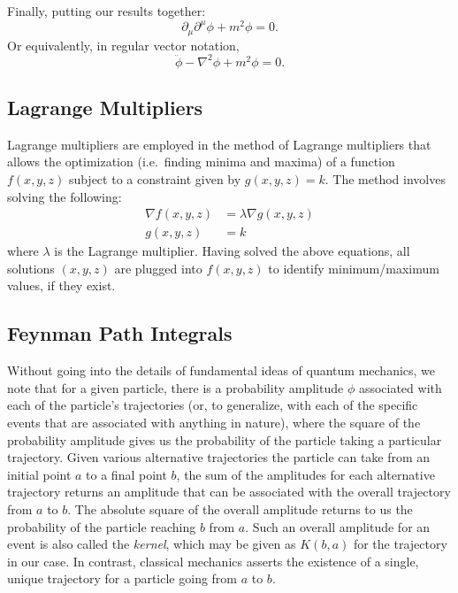 \documentclass[12pt]{revtex4}
\begin{document}
Finally, putting our results together:
\[ \partial_{\mu}\partial^{\mu}\phi + m^2 \phi = 0 .\]
Or equivalently, in regular vector notation,
\[ \ddot{\phi} - \nabla^2\phi + m^2 \phi = 0. \]

\subsection{Lagrange Multipliers} \label{multpliers}
Lagrange multipliers are employed in the method of Lagrange multipliers that allows the optimization (i.e.~finding minima and maxima) of a function $f(x,y,z)$ subject to a constraint given by $g(x,y,z)=k$. The method involves solving the following:
\begin{align*}
	\nabla f(x,y,z) &= \lambda \nabla g(x,y,z) \\
	g(x,y,z)&=k
\end{align*}
where $\lambda$ is the Lagrange multiplier. Having solved the above equations, all solutions $(x,y,z)$ are plugged into $f(x,y,z)$ to identify minimum/maximum values, if they exist. 

\subsection{Feynman Path Integrals} \label{feynman}
Without going into the details of fundamental ideas of quantum mechanics, we note that for a given particle, there is a probability amplitude $\phi$ associated with each of the particle's trajectories (or, to generalize, with each of the specific events that are associated with anything in nature), where the square of the probability amplitude gives us the probability of the particle taking a particular trajectory. Given various alternative trajectories the particle can take from an initial point $a$ to a final point $b$, the sum of the amplitudes for each alternative trajectory returns an amplitude that can be associated with the overall trajectory from $a$ to $b$. The absolute square of the overall amplitude returns to us the probability of the particle reaching $b$ from $a$. Such an overall amplitude for an event is also called the \textit{kernel}, which may be given as $K(b,a)$ for the trajectory in our case. In contrast, classical mechanics asserts the existence of a single, unique trajectory for a particle going from $a$ to $b$. 
\end{document}

